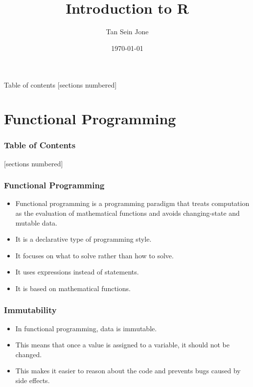 \documentclass[serif, 9pt, aspectratio=32]{beamer}
\title{Introduction to R}
\date{\today}
\author{Tan Sein Jone}
\institute{University of British Columbia}
\begin{document}
\maketitle

\begin{frame}{Table of contents}
    [sections numbered]
    \tableofcontents[hideallsubsections]
\end{frame}

\section{Functional Programming}

\begin{frame}
    \frametitle{Table of Contents}
    [sections numbered]
    \tableofcontents[currentsection]
\end{frame}

\begin{frame}
    \frametitle{Functional Programming}
    \begin{itemize}
        \item Functional programming is a programming paradigm that treats computation as the evaluation of mathematical functions and avoids changing-state and mutable data.
        \item It is a declarative type of programming style.
        \item It focuses on what to solve rather than how to solve.
        \item It uses expressions instead of statements.
        \item It is based on mathematical functions.
    \end{itemize}
\end{frame}

\begin{frame}
    \centering
    \frametitle{Immutability}
    \begin{itemize}
        \setlength{\itemsep}{2em}
        \item In functional programming, data is immutable.
        \item This means that once a value is assigned to a variable, it should not be changed.
        \item This makes it easier to reason about the code and prevents bugs caused by side effects.
    \end{itemize}
\end{frame}
\end{document}
